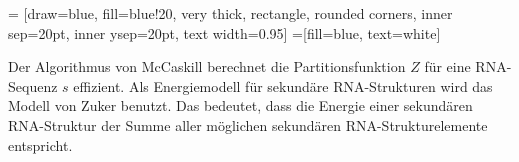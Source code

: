 \newpage

 = [draw=blue, fill=blue!20, very thick, rectangle, rounded corners, inner sep=20pt, inner ysep=20pt, text width=0.95\textwidth]
 =[fill=blue, text=white]
%  

\vspace{1.5em}

Der Algorithmus von McCaskill berechnet die Partitionsfunktion $Z$ für eine RNA-Sequenz $s$ effizient. Als Energiemodell für sekundäre RNA-Strukturen wird das Modell von Zuker benutzt. Das bedeutet, dass die Energie einer sekundären RNA-Struktur der Summe aller möglichen sekundären RNA-Strukturelemente entspricht.
